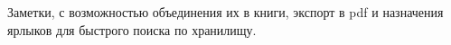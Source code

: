Заметки, с возможностью объединения их в книги, экспорт в pdf и назначения ярлыков для быстрого поиска по хранилищу. 
